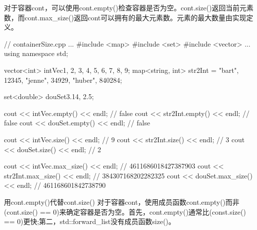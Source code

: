 对于容器cont，可以使用cont.empty()检查容器是否为空。cont.size()返回当前元素数，而cont.max\_size()返回cont可以拥有的最大元素数。元素的最大数量由实现定义。


\begin{cpp}
// containerSize.cpp
...
#include <map>
#include <set>
#include <vector>
...
using namespace std;

vector<int> intVec{1, 2, 3, 4, 5, 6, 7, 8, 9};
map<string, int> str2Int = {{"bart", 12345},
	{"jenne", 34929}, {"huber", 840284}};
	
set<double> douSet{3.14, 2.5};

cout << intVec.empty() << endl; // false
cout << str2Int.empty() << endl; // false
cout << douSet.empty() << endl; // false

cout << intVec.size() << endl; // 9
cout << str2Int.size() << endl; // 3
cout << douSet.size() << endl; // 2

cout << intVec.max_size() << endl; // 4611686018427387903
cout << str2Int.max_size() << endl; // 384307168202282325
cout << douSet.max_size() << endl; // 461168601842738790
\end{cpp}


\begin{myTip}{用cont.empty()代替cont.size()}
对于容器cont，使用成员函数cont.empty()而非(cont.size() == 0)来确定容器是否为空。首先，cont.empty()通常比(const.size() == 0)更快;第二，std::forward\_list没有成员函数size()。	
\end{myTip}











